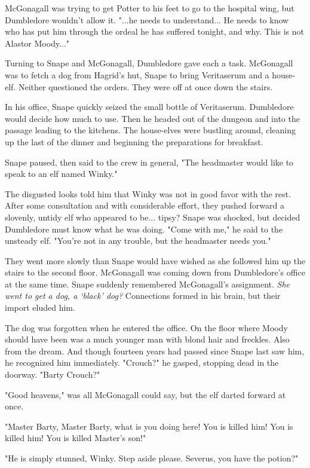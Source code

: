 \documentclass[a4paper,11pt]{article}
\begin{document}
McGonagall was trying to get Potter to his feet to go to the hospital wing, but Dumbledore wouldn't allow it. "...he needs to understand... He needs to know who has put him through the ordeal he has suffered tonight, and why. This is not Alastor Moody..."

Turning to Snape and McGonagall, Dumbledore gave each a task. McGonagall was to fetch a dog from Hagrid's hut, Snape to bring Veritaserum and a house-elf. Neither questioned the orders. They were off at once down the stairs.

In his office, Snape quickly seized the small bottle of Veritaserum. Dumbledore would decide how much to use. Then he headed out of the dungeon and into the passage leading to the kitchens. The house-elves were bustling around, cleaning up the last of the dinner and beginning the preparations for breakfast.

Snape paused, then said to the crew in general, "The headmaster would like to speak to an elf named Winky."

The disgusted looks told him that Winky was not in good favor with the rest. After some consultation and with considerable effort, they pushed forward a slovenly, untidy elf who appeared to be... tipsy? Snape was shocked, but decided Dumbledore must know what he was doing. "Come with me," he said to the unsteady elf. "You're not in any trouble, but the headmaster needs you."

They went more slowly than Snape would have wished as she followed him up the stairs to the second floor. McGonagall was coming down from Dumbledore's office at the same time. Snape suddenly remembered McGonagall's assignment. \emph{She went to get a dog, a `black' dog? }Connections formed in his brain, but their import eluded him.

The dog was forgotten when he entered the office. On the floor where Moody should have been was a much younger man with blond hair and freckles. Also from the dream. And though fourteen years had passed since Snape last saw him, he recognized him immediately. "Crouch?" he gasped, stopping dead in the doorway. "Barty Crouch?"

"Good heavens," was all McGonagall could say, but the elf darted forward at once.

"Master Barty, Master Barty, what is you doing here! You is killed him! You is killed him! You is killed Master's son!"

"He is simply stunned, Winky. Step aside please. Severus, you have the potion?"
\end{document}

